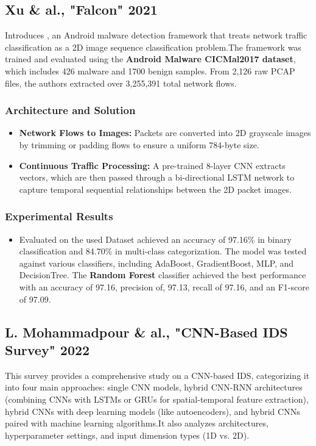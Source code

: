 \documentclass[12pt, a4paper]{report}
\begin{document}
\subsection{Xu \& al., "Falcon" 2021}
Introduces \cite{xu2021falcon}, an Android malware detection framework that treats network traffic classification as a 2D image sequence classification problem.The framework was trained and evaluated using the \textbf{Android Malware CICMal2017 dataset}, which includes 426 malware and 1700 benign samples. From 2,126 raw PCAP files, the authors extracted over 3,255,391 total network flows.

\subsubsection{Architecture and Solution}
\begin{itemize}
    \item \textbf{Network Flows to Images:} Packets are converted into 2D grayscale images by trimming or padding flows to ensure a uniform 784-byte size.
    \item \textbf{Continuous Traffic Processing:} A pre-trained 8-layer CNN extracts vectors, which are then passed through a bi-directional LSTM network to capture temporal sequential relationships between the 2D packet images.
\end{itemize}

\subsubsection{Experimental Results}
\begin{itemize}
    \item Evaluated on the used Dataset achieved an accuracy of 97.16\% in binary classification and 84.70\% in multi-class categorization. The model was tested against various classifiers, including AdaBoost, GradientBoost, MLP, and DecisionTree. The \textbf{Random Forest} classifier achieved the best performance with an accuracy of 97.16, precision of, 97.13, recall of 97.16, and an F1-score of 97.09.
\end{itemize}

\subsection{L. Mohammadpour \& al., "CNN-Based IDS Survey" 2022}
This survey \cite{mohammadpour2022survey} provides a comprehensive study on a CNN-based IDS, categorizing it into four main approaches: single CNN models, hybrid CNN-RNN architectures (combining CNNs with LSTMs or GRUs for spatial-temporal feature extraction), hybrid CNNs with deep learning models (like autoencoders), and hybrid CNNs paired with machine learning algorithms.It also analyzes architectures, hyperparameter settings, and input dimension types (1D vs. 2D).
\end{document}

